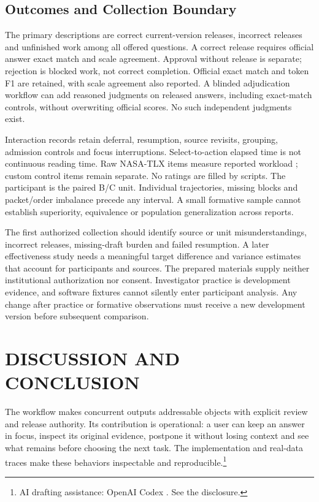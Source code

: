 \documentclass[a4paper,twoside]{article}
\newcommand{\credit}{\footnote{AI drafting assistance: OpenAI Codex \cite{codex}. See the disclosure.}}
\begin{document}
\subsection{Outcomes and Collection Boundary}
The primary descriptions are correct current-version releases, incorrect releases
and unfinished work among all offered questions. A correct release requires
official answer exact match and scale agreement. Approval without release is
separate; rejection is blocked work, not correct completion. Official exact match
and token F1 are retained, with scale agreement also reported. A blinded adjudication
workflow can add reasoned judgments on released answers, including exact-match
controls, without overwriting official scores. No such independent judgments exist.

Interaction records retain deferral, resumption, source revisits, grouping, admission
controls and focus interruptions. Select-to-action elapsed time is not continuous
reading time. Raw NASA-TLX items measure reported workload \cite{tlx}; custom control
items remain separate. No ratings are filled by scripts. The participant is the
paired B/C unit. Individual trajectories, missing blocks and packet/order imbalance
precede any interval. A small formative sample cannot establish superiority,
equivalence or population generalization across reports.

The first authorized collection should identify source or unit misunderstandings,
incorrect releases, missing-draft burden and failed resumption. A later effectiveness
study needs a meaningful target difference and variance estimates that account for
participants and sources. The prepared materials supply neither institutional
authorization nor consent. Investigator practice is development evidence, and
software fixtures cannot silently enter participant analysis. Any change after
practice or formative observations must receive a new development version before
subsequent comparison.

\section{DISCUSSION AND CONCLUSION}
The workflow makes concurrent outputs addressable objects with explicit review
and release authority. Its contribution is operational: a user can keep an answer
in focus, inspect its original evidence, postpone it without losing context and
see what remains before choosing the next task. The implementation and real-data
traces make these behaviors inspectable and reproducible.\credit
\end{document}
